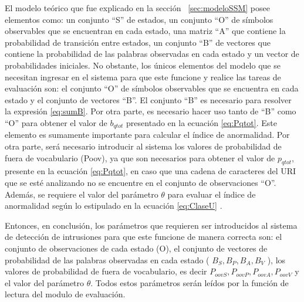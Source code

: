 El modelo teórico que fue explicado en la sección ~\ref{sec:modeloSSM} posee elementos como: un conjunto ``S'' de estados, un conjunto ``O'' de símbolos observables que se encuentran en cada estado, una matriz ``A'' que contiene la probabilidad de transición entre estados, un conjunto ``B'' de vectores que contiene la probabilidad de las palabras observadas en cada estado y un vector de probabilidades iniciales. No obstante, los únicos elementos del modelo que se necesitan ingresar en el sistema para que este funcione y realice las tareas de evaluación son: el conjunto ``O'' de símbolos observables que se encuentra en cada estado y el conjunto de vectores ``B''. El conjunto ``B'' es necesario para resolver la expresión \ref{eq:sumB}. Por otra parte, es necesario hacer uso tanto de ``B'' como ``O'' para obtener el valor de $b_{qtot}$ presentado en la ecuación \ref{eq:Pqtot}. Este elemento es sumamente importante para calcular el índice de anormalidad. Por otra parte, será necesario introducir al sistema los valores de probabilidad de fuera de vocabulario (Poov), ya que son necesarios para obtener el valor de $p_{qtot}$, presente en la ecuación \ref{eq:Pqtot}, en caso que una cadena de caracteres del URI que se esté analizando no se encuentre en el conjunto de observaciones ``O''. Además, se requiere el valor del parámetro $\theta$ para evaluar el índice de anormalidad según lo estipulado en la ecuación \ref{eq:ClaseU} .

    Entonces, en conclusión, los parámetros que requieren ser introducidos al sistema de detección de intrusiones para que este funcione de manera correcta son: el conjunto de observaciones de cada estado (O), el conjunto de vectores de probabilidad de las palabras observadas en cada estado ( $B_{S}, B_{P}, B_{A}, B_{V}$ ), los valores de probabilidad de fuera de vocabulario, es decir $P_{oovS}, P_{oovP}, P_{oovA}, P_{oovV}$ y el valor del parámetro $\theta$. Todos estos parámetros serán leídos por la función de lectura del modulo de evaluación.
    
